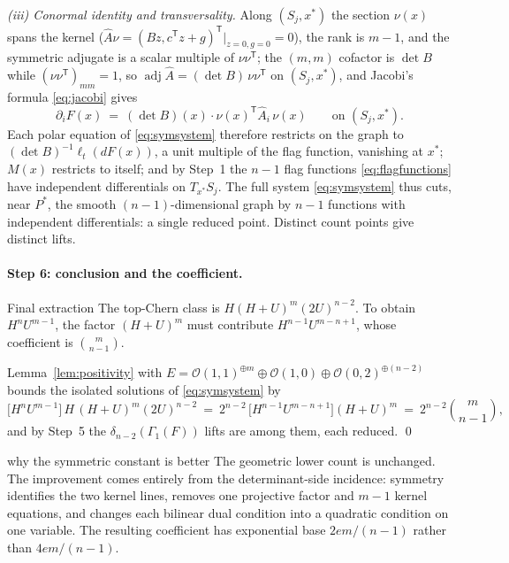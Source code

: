 \documentclass[acmsmall,screen,nonacm]{acmart}
\theoremstyle{definition}
\theoremstyle{remark}
\DeclareMathOperator{\adj}{adj}
\newcommand{\OO}{\mathcal{O}}
\newcommand{\pdeg}{\delta}
\newcommand{\Gone}{\Gamma_{\!1}}
\begin{document}
\emph{(iii) Conormal identity and transversality.}  Along
$(S_j,x^*)$ the section $\nu(x)$ spans the kernel
($\widehat A\nu=(Bz,c^{\mathsf T}z+g)^{\mathsf T}|_{z=0,g=0}=0$), the
rank is $m-1$, and the symmetric adjugate is a scalar multiple of
$\nu\nu^{\mathsf T}$; the $(m,m)$ cofactor is $\det B$ while
$(\nu\nu^{\mathsf T})_{mm}=1$, so
$\adj\widehat A=(\det B)\,\nu\nu^{\mathsf T}$ on $(S_j,x^*)$, and
Jacobi's formula \eqref{eq:jacobi} gives
\[
  \partial_iF(x)\ =\ (\det B)(x)\cdot
  \nu(x)^{\mathsf T}\widehat A_i\,\nu(x)
  \qquad\text{on }(S_j,x^*).
\]
Each polar equation of \eqref{eq:symsystem} therefore restricts on the
graph to $(\det B)^{-1}\ell_t(dF(x))$, a unit multiple of the flag
function, vanishing at $x^*$; $M(x)$ restricts to itself; and by
Step~1 the $n-1$ flag functions \eqref{eq:flagfunctions} have
independent differentials on $T_{x^*}S_j$.  The full system
\eqref{eq:symsystem} thus cuts, near $P^*$, the smooth
$(n-1)$-dimensional graph by $n-1$ functions with independent
differentials: a single reduced point.  Distinct count points give
distinct lifts.

\paragraph{Step 6: conclusion and the coefficient.}
\begin{detailbox}{Final extraction}
The top-Chern class is $H(H+U)^m(2U)^{n-2}$.  To obtain
$H^nU^{m-1}$, the factor $(H+U)^m$ must contribute
$H^{n-1}U^{m-n+1}$, whose coefficient is $\binom{m}{n-1}$.
\end{detailbox}
Lemma~\ref{lem:positivity} with
$E=\OO(1,1)^{\oplus m}\oplus\OO(1,0)\oplus\OO(0,2)^{\oplus(n-2)}$
bounds the isolated solutions of \eqref{eq:symsystem} by
\[
  \big[H^nU^{m-1}\big]\,H\,(H+U)^m(2U)^{n-2}
  \ =\ 2^{n-2}\,\big[H^{n-1}U^{m-n+1}\big](H+U)^m
  \ =\ 2^{n-2}\binom{m}{n-1},
\]
and by Step~5 the $\pdeg_{n-2}(\Gone(F))$ lifts are among them, each
reduced.
\qed

\begin{checklistbox}{why the symmetric constant is better}
The geometric lower count is unchanged.  The improvement comes entirely from
the determinant-side incidence: symmetry identifies the two kernel lines,
removes one projective factor and $m-1$ kernel equations, and changes each
bilinear dual condition into a quadratic condition on one variable.  The
resulting coefficient has exponential base $2em/(n-1)$ rather than
$4em/(n-1)$.
\end{checklistbox}
\end{document}
